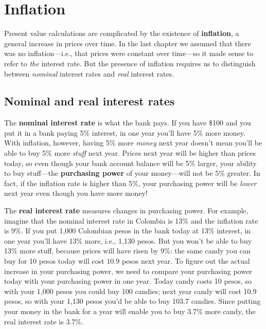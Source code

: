 \chapter{Inflation}
\label{1moretime}


Present value calculations are complicated by the existence of \textbf{inflation}, a general increase in prices over time. In the last chapter we assumed that there was no inflation---i.e., that prices were constant over time---so it made sense to refer to \emph{the} interest rate. But the presence of inflation requires us to distinguish between \emph{nominal} interest rates and \emph{real} interest rates.

\section{Nominal and real interest rates}
\label{sec:realnominal}

The \textbf{nominal interest rate} is what the bank pays. If you have \$100 and you put it in a bank paying 5\% interest, in one year you'll have 5\% more money. With inflation, however, having 5\% more \emph{money} next year doesn't mean you'll be able to buy 5\% more \emph{stuff} next year. Prices next year will be higher than prices today, so even though your bank account balance will be 5\% larger, your ability to buy stuff---the \textbf{purchasing power} of your money---will not be 5\% greater. In fact, if the inflation rate is higher than 5\%, your purchasing power will be \emph{lower} next year even though you have more money!

The \textbf{real interest rate} measures changes in purchasing power. For example, imagine that the nominal interest rate in Colombia is 13\% and the inflation rate is 9\%. If you put 1,000 Colombian pesos in the bank today at 13\% interest, in one year you'll have 13\% more, i.e., 1,130 pesos. But you won't be able to buy 13\% more stuff, because prices will have risen by 9\%: the same candy you can buy for 10 pesos today will cost $10.9$ pesos next year. To figure out the actual increase in your purchasing power, we need to compare your purchasing power today with your purchasing power in one year. Today candy costs 10 pesos, so with your 1,000 pesos you could buy 100 candies; next year candy will cost 10.9 pesos, so with your 1,130 pesos you'd be able to buy 103.7 candies. Since putting your money in the bank for a year will enable you to buy 3.7\% more candy, the real interest rate is 3.7\%.


